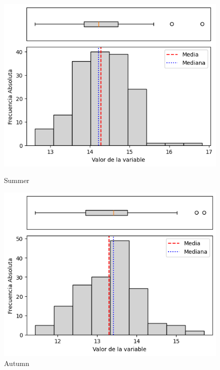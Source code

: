 \begin{figure}[H]
\centering
\begin{minipage}{0.30\textwidth}
  \includegraphics[width=\linewidth]{resultados/por_estacion_del_anio/boxplot_clases_por_estacion/Andahuaylas/T_HistBoxplot_Summer.png}
  \caption*{Summer}
\end{minipage}
\hfill
\begin{minipage}{0.30\textwidth}
  \includegraphics[width=\linewidth]{resultados/por_estacion_del_anio/boxplot_clases_por_estacion/Andahuaylas/T_HistBoxplot_Autumn.png}
  \caption*{Autumn}
\end{minipage}

\vspace{0.2cm}


\end{figure}
